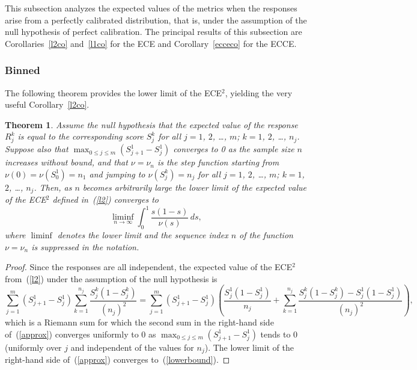 \documentclass{article}
\newtheorem{theorem}{Theorem}[]
\begin{document}
This subsection analyzes the expected values of the metrics when the responses
arise from a perfectly calibrated distribution, that is,
under the assumption of the null hypothesis of perfect calibration.
The principal results of this subsection
are Corollaries~\ref{l2co} and~\ref{l1co} for the ECE
and Corollary~\ref{ecceco} for the ECCE.

\subsubsection{Binned}

The following theorem provides the lower limit of the ECE$^2$,
yielding the very useful Corollary~\ref{l2co}.

\begin{theorem}
\label{perfectly}
Assume the null hypothesis that the expected value of the response $R_j^k$ is
equal to the corresponding score $S_j^k$ for all $j = 1$, $2$, \dots, $m$;
$k = 1$, $2$, \dots, $n_j$.
Suppose also that $\max_{0 \le j \le m} (S_{j+1}^1 - S_j^1)$ converges to 0
as the sample size $n$ increases without bound,
and that $\nu = \nu_n$ is the step function
starting from $\nu(0) = \nu(S_0^1) = n_1$ and jumping to $\nu(S_j^k) = n_j$
for all $j = 1$, $2$, \dots, $m$; $k = 1$, $2$, \dots, $n_j$.
Then, as $n$ becomes arbitrarily large
the lower limit of the expected value of the ECE$^2$ defined in~(\ref{l2})
converges to
%
\begin{equation}
\label{lowerbound}
\liminf_{n \to \infty} \int_0^1 \frac{s (1 - s)}{\nu(s)} \, ds,
\end{equation}
%
where $\liminf$ denotes the lower limit and the sequence index $n$
of the function $\nu = \nu_n$ is suppressed in the notation.
\end{theorem}

\begin{proof}
Since the responses are all independent, the expected value of the ECE$^2$
from~(\ref{l2}) under the assumption of the null hypothesis is
%
\begin{equation}
\label{approx}
\sum_{j=1}^m \left( S_{j+1}^1 - S_j^1 \right)
\sum_{k=1}^{n_j} \frac{S_j^k \left( 1 - S_j^k \right)}{(n_j)^2}
= \sum_{j=1}^m \left( S_{j+1}^1 - S_j^1 \right)
\left( \frac{S_j^1 \left( 1 - S_j^1 \right)}{n_j}
+ \sum_{k=1}^{n_j}\frac{S_j^k \left( 1 - S_j^k \right)
                        - S_j^1 \left( 1 - S_j^1 \right)}{(n_j)^2} \right),
\end{equation}
%
which is a Riemann sum for which the second sum in the right-hand side
of~(\ref{approx}) converges uniformly to 0
as $\max_{0 \le j \le m} (S_{j+1}^1 - S_j^1)$ tends to 0
(uniformly over $j$ and independent of the values for $n_j$).
The lower limit of the right-hand side of~(\ref{approx})
converges to~(\ref{lowerbound}).
\end{proof}
\end{document}
